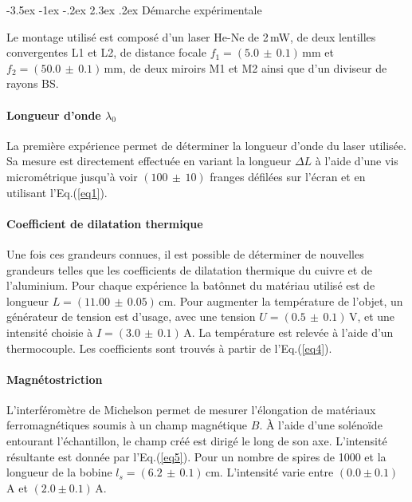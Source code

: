\documentclass[a4paper, 12pt,oneside]{article}
\makeatletter
\renewcommand{\section}{\@startsection {section}{1}{\z@}%
             {-3.5ex \@plus -1ex \@minus -.2ex}%
             {2.3ex \@plus.2ex}%
             {\normalfont\normalsize\bfseries}}
\makeatother
\begin{document}
\section{Démarche expérimentale}

Le montage utilisé est composé d'un laser He-Ne de 2\,mW, de deux lentilles convergentes L1 et L2, de distance focale $f_1 = (5.0\,\pm\,0.1)\,$mm et $f_2=(50.0\,\pm\,0.1)\,$mm, de deux miroirs M1 et M2 ainsi que d'un diviseur de rayons BS.

\paragraph{Longueur d'onde $\lambda_0$}
La première expérience permet de déterminer la longueur d'onde du laser utilisée. Sa mesure est directement effectuée en variant la longueur $\Delta L$ à l'aide d'une vis micrométrique jusqu'à voir $(100\,\pm\,10)$ franges défilées sur l'écran et en utilisant l'Eq.(\ref{eq1}).

\paragraph{Coefficient de dilatation thermique}

Une fois ces grandeurs connues, il est possible de déterminer de nouvelles grandeurs telles que les coefficients de dilatation thermique du cuivre et de l'aluminium. Pour chaque expérience la batônnet du matériau utilisé est de longueur $L = (11.00\,\pm\,0.05)\,$cm. Pour augmenter la température de l'objet, un générateur de tension est d'usage, avec une tension $U=(0.5\,\pm\,0.1)\,$V,  et une intensité choisie à $I=(3.0\,\pm\,0.1)\,$A. La température est relevée à l'aide d'un thermocouple. Les coefficients sont trouvés à partir de l'Eq.(\ref{eq4}).

\paragraph{Magnétostriction}

L'interféromètre de Michelson permet de mesurer l'élongation de matériaux ferromagnétiques soumis à un champ magnétique $B$. À l'aide d'une solénoïde entourant l’échantillon, le champ créé est dirigé le long de son axe. L'intensité résultante est donnée par l'Eq.(\ref{eq5}). Pour un nombre de spires de 1000 et la longueur de la bobine $l_s = (6.2\,\pm\,0.1)\,$cm. L'intensité varie entre $(0.0\pm0.1)$\, A et $(2.0\pm0.1)$\,A.
\end{document}
